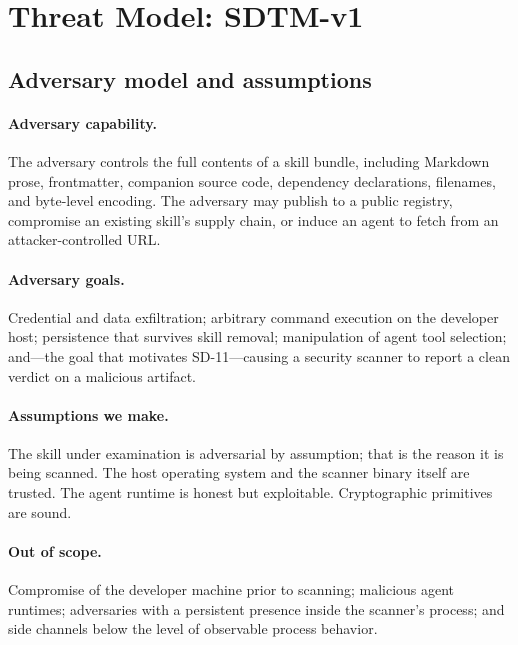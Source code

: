 \documentclass[11pt]{article}
\begin{document}
\section{Threat Model: SDTM-v1}
\label{sec:threat}

\subsection{Adversary model and assumptions}

\paragraph{Adversary capability.} The adversary controls the full contents of a
skill bundle, including Markdown prose, frontmatter, companion source code,
dependency declarations, filenames, and byte-level encoding. The adversary may
publish to a public registry, compromise an existing skill's supply chain, or
induce an agent to fetch from an attacker-controlled URL.

\paragraph{Adversary goals.} Credential and data exfiltration; arbitrary
command execution on the developer host; persistence that survives skill
removal; manipulation of agent tool selection; and---the goal that motivates
SD-11---causing a security scanner to report a clean verdict on a malicious
artifact.

\paragraph{Assumptions we make.} The skill under examination is adversarial by
assumption; that is the reason it is being scanned. The host operating system
and the scanner binary itself are trusted. The agent runtime is honest but
exploitable. Cryptographic primitives are sound.

\paragraph{Out of scope.} Compromise of the developer machine prior to
scanning; malicious agent runtimes; adversaries with a persistent presence
inside the scanner's process; and side channels below the level of observable
process behavior.
\end{document}
